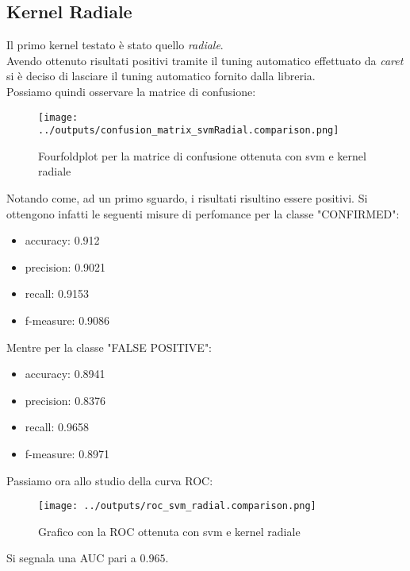 \subsection{Kernel Radiale}
Il primo kernel testato è stato quello \textit{radiale}.\\
Avendo ottenuto risultati positivi tramite il tuning automatico effettuato da
\textit{caret} si è deciso di lasciare il tuning automatico fornito dalla 
libreria.\\
Possiamo quindi osservare la matrice di confusione:
\begin{figure}[H]
    \centering
    \texttt{[image: ../outputs/confusion\_matrix\_svmRadial.comparison.png]}
    \caption{Fourfoldplot per la matrice di confusione ottenuta con svm e kernel radiale}
\end{figure}
Notando come, ad un primo sguardo, i risultati risultino essere positivi.
Si ottengono infatti le seguenti misure di perfomance per la classe "CONFIRMED":
\begin{itemize}
    \item accuracy: 0.912 
    \item precision: 0.9021
    \item recall: 0.9153
    \item f-measure: 0.9086 
\end{itemize}
Mentre per la classe "FALSE POSITIVE":
\begin{itemize}
    \item accuracy: 0.8941 
    \item precision: 0.8376  
    \item recall: 0.9658 
    \item f-measure: 0.8971
\end{itemize}
Passiamo ora allo studio della curva ROC:
\begin{figure}[H]
    \centering
    \texttt{[image: ../outputs/roc\_svm\_radial.comparison.png]}
    \caption{Grafico con la ROC ottenuta con svm e kernel radiale}
\end{figure}
Si segnala una AUC pari a $0.965$.

